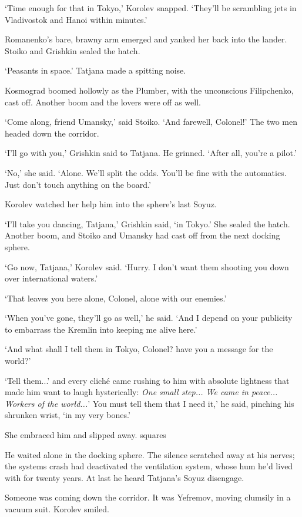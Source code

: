 `Time enough for that in Tokyo,' Korolev snapped. `They'll be scrambling jets in Vladivostok and Hanoi within minutes.'

Romanenko's bare, brawny arm emerged and yanked her back into the lander. Stoiko and Grishkin sealed the hatch.

`Peasants in space.' Tatjana made a spitting noise.

Kosmograd boomed hollowly as the Plumber, with the unconscious Filipchenko, cast off. Another boom and the lovers were off as well.

`Come along, friend Umansky,' said Stoiko. `And farewell, Colonel!' The two men headed down the corridor.

`I'll go with you,' Grishkin said to Tatjana. He grinned. `After all, you're a pilot.'

`No,' she said. `Alone. We'll split the odds. You'll be fine with the automatics. Just don't touch anything on the board.'

Korolev watched her help him into the sphere's last Soyuz.

`I'll take you dancing, Tatjana,' Grishkin said, `in Tokyo.' She sealed the hatch. Another boom, and Stoiko and Umansky had cast off from the next docking sphere.

`Go now, Tatjana,' Korolev said. `Hurry. I don't want them shooting you down over international waters.'

`That leaves you here alone, Colonel, alone with our enemies.'

`When you've gone, they'll go as well,' he said. `And I depend on your publicity to embarrass the Kremlin into keeping me alive here.'

`And what shall I tell them in Tokyo, Colonel? have you a message for the world?'

`Tell them...' and every cliché came rushing to him with absolute lightness that made him want to laugh hysterically: \textit{One small step... We came in peace... Workers of the world...}' You must tell them that I need it,' he said, pinching his shrunken wrist, `in my very bones.'

She embraced him and slipped away.
squares

He waited alone in the docking sphere. The silence scratched away at his nerves; the systems crash had deactivated the ventilation system, whose hum he'd lived with for twenty years. At last he heard Tatjana's Soyuz disengage.

Someone was coming down the corridor. It was Yefremov, moving clumsily in a vacuum suit. Korolev smiled.


